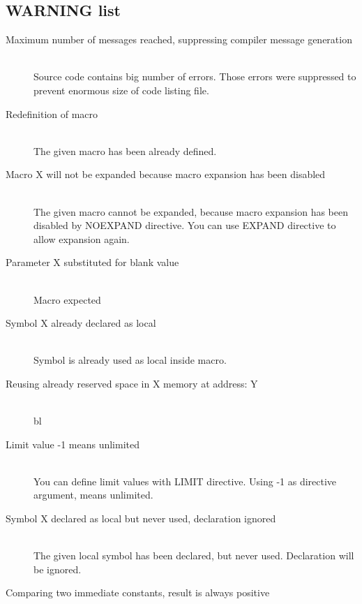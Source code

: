                  \subsection{WARNING list}
                    \begin{description}
                    \item[Maximum number of messages reached, suppressing compiler message generation] \hfill \\
                    Source code contains big number of errors. Those errors were suppressed to prevent enormous size of code listing file.
                    \item[Redefinition of macro ] \hfill \\
                    The given macro has been already defined.
                    \item[Macro X will not be expanded because macro expansion has been disabled] \hfill \\
                    The given macro cannot be expanded, because macro expansion has been disabled by NOEXPAND directive.
                    You can use EXPAND directive to allow expansion again.
                    \item[Parameter X substituted for blank value ] \hfill \\     %
                    Macro expected
                    \item[Symbol X already declared as local ] \hfill \\
                    Symbol is already used as local inside macro.   %
                    \item[Reusing already reserved space in X memory at address: Y] \hfill \\  %
                    bl
                    \item[Limit value -1 means unlimited] \hfill \\
                    You can define limit values with LIMIT directive. Using -1 as directive argument, means unlimited.
                    \item[Symbol X declared as local but never used, declaration ignored] \hfill \\
                    The given local symbol has been declared, but never used. Declaration will be ignored.
                    \item[Comparing two immediate constants, result is always positive] \hfill \\


\end{description}
